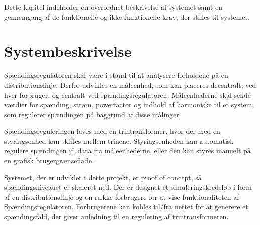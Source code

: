 
Dette kapitel indeholder en overordnet beskrivelse af systemet samt en gennemgang af de funktionelle og ikke funktionelle krav, der stilles til systemet. 

\section{Systembeskrivelse}
Spændingsregulatoren skal være i stand til at analysere forholdene på en distributionslinje. Derfor udvikles en måleenhed, som kan placeres decentralt, ved hver forbruger, og centralt ved spændingsregulatoren. Måleenhederne skal sende værdier for spænding, strøm, powerfactor og indhold af harmoniske til et system, som regulerer spændingen på baggrund af disse målinger. 

Spændingsreguleringen laves med en trintransformer, hvor der med en styringsenhed kan skiftes mellem trinene. Styringsenheden kan automatisk regulere spændingen jf. data fra måleenhederne, eller den kan styres manuelt på en grafisk brugergrænseflade. 

Systemet, der er udviklet i dette projekt, er proof of concept, så spændingsniveauet er skaleret ned.  Der er designet et simuleringskredsløb i form af en distributionslinje og en række forbrugere for at vise funktionaliteten af Spændingsregulatoren. Forbrugerene  kan kobles til/fra nettet for at generere et spændingsfald, der giver anledning til en regulering af trintransformeren. 


